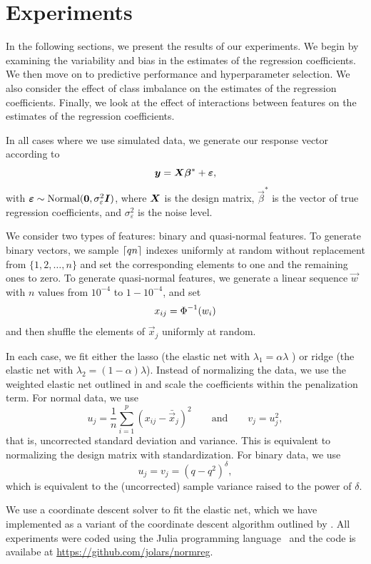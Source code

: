 \section{Experiments}
\label{sec:experiments}

In the following sections, we present the results of our experiments. We begin by examining the variability and bias in the estimates of the regression coefficients. We then move on to predictive performance and hyperparameter selection. We also consider the effect of class imbalance on the estimates of the regression coefficients. Finally, we look at the effect of interactions between features on the estimates of the regression coefficients.

In all cases where we use simulated data, we generate our response vector according to
\[
  \boldsymbol{y} = \boldsymbol{X}\boldsymbol{\beta}^* + \boldsymbol{\varepsilon},
\]
with \(\boldsymbol{\varepsilon} \sim \operatorname{Normal}(\boldsymbol{0}, \sigma_\varepsilon^2 \boldsymbol{I})\), where \(\boldsymbol{X}\) is the design matrix, \(\vec{\beta}^*\) is the vector of true regression coefficients, and \(\sigma_\varepsilon^2\) is the noise level.

We consider two types of features: binary and quasi-normal features.
To generate binary vectors, we sample \(\lceil qn \rceil\) indexes uniformly at random without replacement from \(\{1,2,\dots,n\}\) and set the corresponding elements to one and the remaining ones to zero.
To generate quasi-normal features, we generate a linear sequence \(\vec{w}\) with \(n\) values from  \(10^{-4}\) to \(1 - 10^{-4}\), and set
\[
  x_{ij} = \operatorname{\Phi}^{-1}(w_i)
\]
and then shuffle the elements of \(\vec{x}_j\) uniformly at random.

In each case, we fit either the lasso (the elastic net with \(\lambda_1 = \alpha \lambda\) ) or ridge (the elastic net with \(\lambda_2 = (1 - \alpha)\lambda\)). Instead of normalizing the data, we use the weighted elastic net outlined in  and scale the coefficients within the penalization term. For normal data, we use
\[
  u_j = \frac{1}{n}\sum_{i=1}^p (x_{ij} - \bar{\vec{x}}_j)^2\qquad\text{and}\qquad v_j= u_j^2,
\]
that is, uncorrected standard deviation and variance. This is equivalent to normalizing the design matrix with standardization. For binary data, we use
\[
  u_j = v_j = (q - q^2)^\delta,
\]
which is equivalent to the (uncorrected) sample variance raised to the power of \(\delta\).

We use a coordinate descent solver to fit the elastic net, which we have implemented as a variant of the coordinate descent algorithm outlined by \citet{friedman2010}. All experiments were coded using the Julia programming language~\citep{bezanson2017} and the code is availabe at \url{https://github.com/jolars/normreg}.

